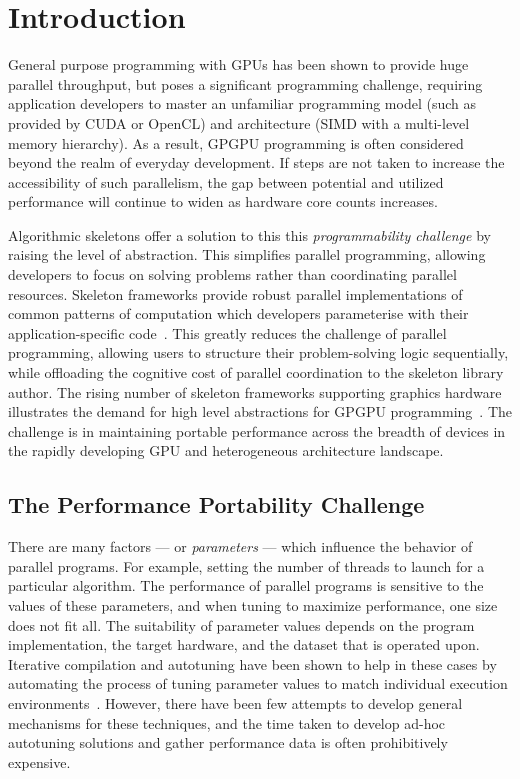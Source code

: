 \documentclass[nonatbib,preprint,nocopyrightspace,9pt]{sigplanconf}
\begin{document}
\section{Introduction}\label{sec:introduction}

General purpose programming with GPUs has been shown to provide huge
parallel throughput, but poses a significant programming challenge,
requiring application developers to master an unfamiliar programming
model (such as provided by CUDA or OpenCL) and architecture (SIMD with
a multi-level memory hierarchy). As a result, GPGPU programming is
often considered beyond the realm of everyday development. If steps
are not taken to increase the accessibility of such parallelism, the
gap between potential and utilized performance will continue to widen
as hardware core counts increases.

Algorithmic skeletons offer a solution to this this
\emph{programmability challenge} by raising the level of
abstraction. This simplifies parallel programming, allowing developers
to focus on solving problems rather than coordinating parallel
resources. Skeleton frameworks provide robust parallel implementations
of common patterns of computation which developers parameterise with
their application-specific code~\cite{Gonzalez2010}. This greatly
reduces the challenge of parallel programming, allowing users to
structure their problem-solving logic sequentially, while offloading
the cognitive cost of parallel coordination to the skeleton library
author. The rising number of skeleton frameworks supporting graphics
hardware illustrates the demand for high level abstractions for GPGPU
programming~\cite{Enmyren2010,Marques2013}. The challenge is in
maintaining portable performance across the breadth of devices in the
rapidly developing GPU and heterogeneous architecture landscape.


\subsection{The Performance Portability Challenge}

There are many factors --- or \emph{parameters} --- which influence
the behavior of parallel programs. For example, setting the number of
threads to launch for a particular algorithm. The performance of
parallel programs is sensitive to the values of these parameters, and
when tuning to maximize performance, one size does not fit all. The
suitability of parameter values depends on the program implementation,
the target hardware, and the dataset that is operated upon. Iterative
compilation and autotuning have been shown to help in these cases by
automating the process of tuning parameter values to match individual
execution environments~\cite{Kisuki}. However, there have been few
attempts to develop general mechanisms for these techniques, and the
time taken to develop ad-hoc autotuning solutions and gather
performance data is often prohibitively expensive.
\end{document}
